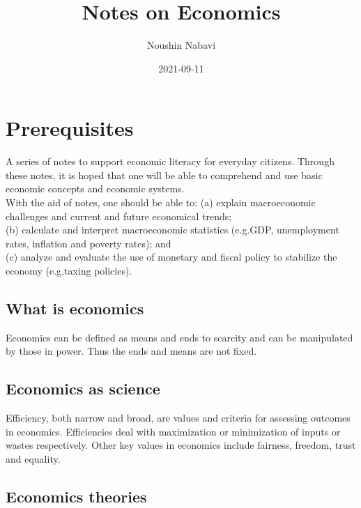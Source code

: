 \documentclass[
]{book}
\title{Notes on Economics}
\author{Noushin Nabavi}
\date{2021-09-11}
\begin{document}
\maketitle

{
\setcounter{tocdepth}{1}
\tableofcontents
}
\hypertarget{prerequisites}{%
\chapter{Prerequisites}\label{prerequisites}}

A series of notes to support economic literacy for everyday citizens. Through these notes, it is hoped that one will be able to comprehend and use basic economic concepts and economic systems.\\
With the aid of notes, one should be able to:
(a) explain macroeconomic challenges and current and future economical trends;\\
(b) calculate and interpret macroeconomic statistics (e.g.GDP, unemployment rates, inflation and poverty rates); and\\
(c) analyze and evaluate the use of monetary and fiscal policy to stabilize the economy (e.g.taxing policies).

\hypertarget{what-is-economics}{%
\section{What is economics}\label{what-is-economics}}

Economics can be defined as means and ends to scarcity and can be manipulated by those in power. Thus the ends and means are not fixed.

\hypertarget{economics-as-science}{%
\section{Economics as science}\label{economics-as-science}}

Efficiency, both narrow and broad, are values and criteria for assessing outcomes in economics. Efficiencies deal with maximization or minimization of inputs or wastes respectively. Other key values in economics include fairness, freedom, trust and equality.

\hypertarget{economics-theories}{%
\section{Economics theories}\label{economics-theories}}
\end{document}
